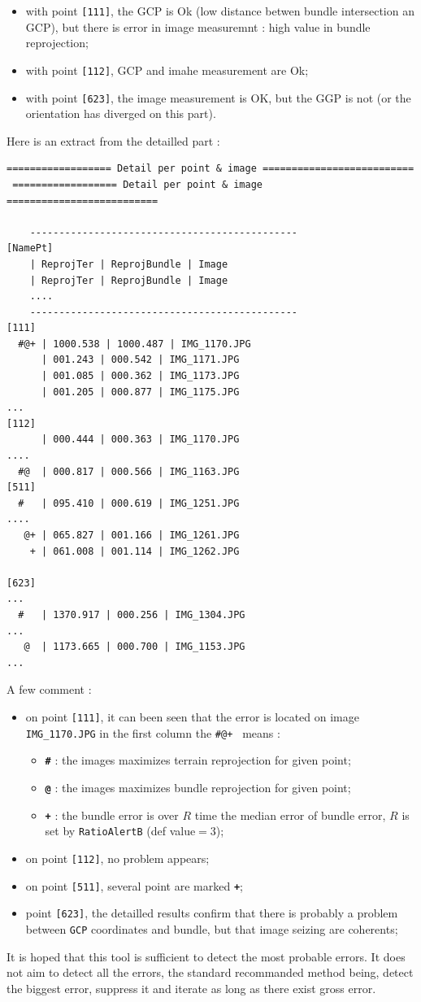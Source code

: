 \begin{itemize}
   \item with point {\tt [111]}, the GCP is Ok (low distance betwen bundle intersection an GCP),
         but there is error in image measuremnt : high value in bundle reprojection;

   \item with point {\tt [112]}, GCP and imahe measurement are Ok;

   \item with point {\tt [623]}, the image measurement is OK, but the GGP is not (or the orientation
         has diverged on this part).
\end{itemize}

Here is an extract from the detailled part :

\begin{verbatim}
================== Detail per point & image ==========================
 ================== Detail per point & image ==========================

    ----------------------------------------------
[NamePt]
    | ReprojTer | ReprojBundle | Image
    | ReprojTer | ReprojBundle | Image
    ....
    ----------------------------------------------
[111]
  #@+ | 1000.538 | 1000.487 | IMG_1170.JPG
      | 001.243 | 000.542 | IMG_1171.JPG
      | 001.085 | 000.362 | IMG_1173.JPG
      | 001.205 | 000.877 | IMG_1175.JPG
...
[112]
      | 000.444 | 000.363 | IMG_1170.JPG
....
  #@  | 000.817 | 000.566 | IMG_1163.JPG
[511]
  #   | 095.410 | 000.619 | IMG_1251.JPG
....
   @+ | 065.827 | 001.166 | IMG_1261.JPG
    + | 061.008 | 001.114 | IMG_1262.JPG

[623]
...
  #   | 1370.917 | 000.256 | IMG_1304.JPG
...
   @  | 1173.665 | 000.700 | IMG_1153.JPG
...
\end{verbatim}

A few comment :

\begin{itemize}
   \item on point  {\tt [111]}, it can been seen that the error is located on image {\tt IMG\_1170.JPG}  
         in the first column the {\tt \#@+ } means :
    \begin{itemize}
         \item {\bf \tt \#} : the images maximizes terrain reprojection for given point;
         \item {\bf \tt @} : the images maximizes bundle reprojection for given point;
         \item {\bf \tt +} : the bundle error is over $R$ time the median error of bundle error,
              $R$ is set by {\tt RatioAlertB}  (def value$=3$);
    \end{itemize}
   \item on point  {\tt [112]}, no problem appears;
   \item on point  {\tt [511]}, several point are marked  {\bf \tt +};
   \item point  {\tt [623]}, the detailled results confirm that there is probably a problem between  {\tt GCP}
         coordinates and bundle,  but that image seizing are coherents;
\end{itemize}

It is hoped that this tool is sufficient to detect the most probable errors. It does
not aim to detect all the errors, the standard recommanded method being, detect
the biggest error, suppress it and iterate as long as there exist gross error.






